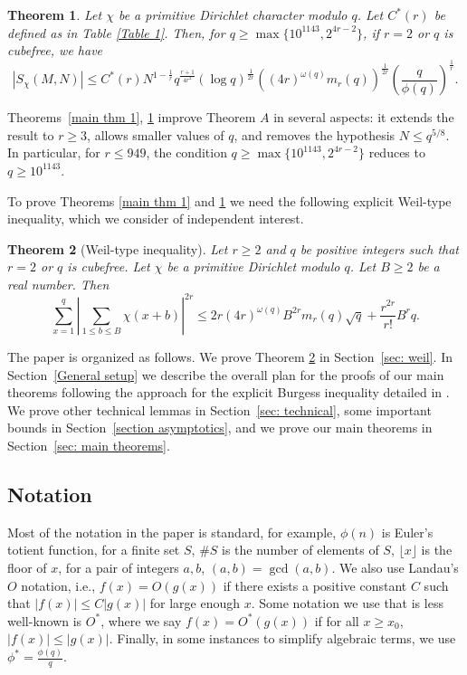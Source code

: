 \documentclass[12pt]{amsart}
\theoremstyle{plain}
\newtheorem{theorem}{Theorem}[section]
\theoremstyle{definition}
\begin{document}
\begin{theorem}\label{main theorem 2}
    Let $\chi$ be a primitive Dirichlet character modulo $q$. Let $C^{*}(r)$ be defined as in Table \ref{Table 1}. Then, for $q \ge \max\{10^{1143}, 2^{4r-2}\}$, if $r=2$ or $q$ is cubefree, we have
    $$|S_{\chi}(M,N)| \le C^{*}(r)N^{1-\frac{1}{r}} q^{\frac{r+1}{4r^2}}(\log{q})^{\frac{1}{2r}}\left((4r)^{\omega(q)}m_r(q)\right)^{\frac{1}{2r}}\left(\frac{q}{\phi(q)}\right)^{\frac{1}{r}}.$$
\end{theorem}
Theorems~\ref{main thm 1}, \ref{main theorem 2} improve Theorem $A$ in several aspects: it extends the result to $r\geq 3$, allows smaller values of $q$, and removes the hypothesis $N\leq q^{5/8}$. In particular, for $r\leq 949$, the condition $q\geq \max\{10^{1143},2^{4r-2}\}$ reduces to $q\geq 10^{1143}$.

To prove Theorems \ref{main thm 1} and \ref{main theorem 2} we need the following explicit Weil-type inequality, which we consider of independent interest. 

\begin{theorem}[Weil-type inequality]\label{weil}
Let $r\ge 2$ and $q$ be positive integers such that $r=2$ or $q$ is cubefree. Let $\chi$ be a primitive Dirichlet modulo $q$. Let $B \ge 2$ be a real number.  
Then
\begin{equation*}
\sum_{x=1}^q\left|\sum_{1\le b\le B}\chi(x+b)\right|^{2r} \le 2r(4r)^{\omega(q)} B^{2r}m_r(q)\sqrt{q} + \frac{r^{2r}}{r!} B^r q.
\end{equation*}
\end{theorem}

The paper is organized as follows. We prove Theorem \ref{weil} in Section~\ref{sec: weil}. In Section~\ref{General setup} we describe the overall plan for the proofs of our main theorems following the approach for the explicit Burgess inequality detailed in \cite[Theorem 12.6]{IK2004}. We prove other technical lemmas in Section~\ref{sec: technical}, some important bounds in Section~\ref{section asymptotics}, and we prove our main theorems in Section~\ref{sec: main theorems}.

\subsection*{Notation}
Most of the notation in the paper is standard, for example, $\phi(n)$ is Euler's totient function, for a finite set $S$, $\#S$ is the number of elements of $S$, $\lfloor x\rfloor$ is the floor of $x$, for a pair of integers $a,b$, $(a,b) = \gcd(a,b)$. We also use Landau's $O$ notation, i.e., $f(x) = O(g(x))$ if there exists a positive constant $C$ such that $|f(x)| \le C|g(x)|$ for large enough $x$. Some notation we use that is less well-known is $O^*$, where we say $f(x) = O^*(g(x))$ if for all $x\ge x_0$, $|f(x)| \le |g(x)|$. Finally, in some instances to simplify algebraic terms, we use $\phi^* =\frac{\phi(q)}{q}$.
\end{document}
